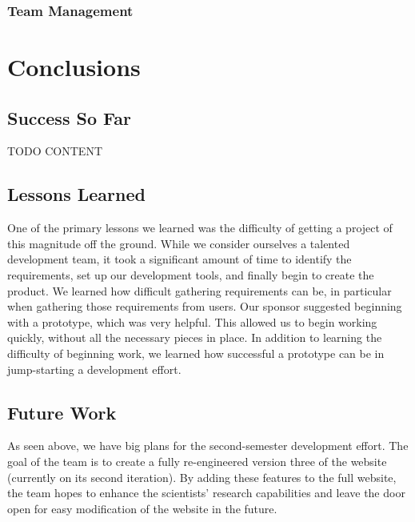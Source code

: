 \documentclass[12pt]{article}
\begin{document}
\begin{spacing}{1.5}
\subsubsection{Team Management}

\clearpage

\section{Conclusions}
\subsection{Success So Far}
TODO CONTENT
\subsection{Lessons Learned}
One of the primary lessons we learned was the difficulty of getting a project of this magnitude off the ground. While we consider ourselves a talented development team, it took a significant amount of time to identify the requirements, set up our development tools, and finally begin to create the product. We learned how difficult gathering requirements can be, in particular when gathering those requirements from users. Our sponsor suggested beginning with a prototype, which was very helpful. This allowed us to begin working quickly, without all the necessary pieces in place. In addition to learning the difficulty of beginning work, we learned how successful a prototype can be in jump-starting a development effort.
\subsection{Future Work}
As seen above, we have big plans for the second-semester development effort. The goal of the team is to create a fully re-engineered version three of the website (currently on its second iteration). By adding these features to the full website, the team hopes to enhance the scientists' research capabilities and leave the door open for easy modification of the website in the future.

\end{spacing}
\end{document}

